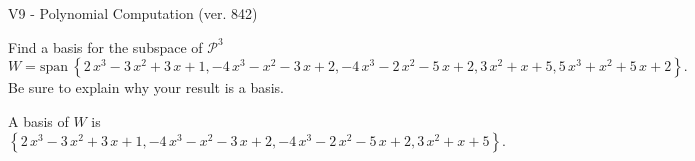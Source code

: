 \begin{exercise}
  \begin{exerciseTitle}V9 - Polynomial Computation (ver. 842)\end{exerciseTitle}
  \begin{exerciseStatement}
    Find a basis for the subspace of \(\mathcal{P}^3\) 
\[W=\mathrm{span}\ \left\{2 \, x^{3} - 3 \, x^{2} + 3 \, x + 1 , -4 \, x^{3} - x^{2} - 3 \, x + 2 , -4 \, x^{3} - 2 \, x^{2} - 5 \, x + 2 , 3 \, x^{2} + x + 5 , 5 \, x^{3} + x^{2} + 5 \, x + 2\right\}.\]
 Be sure to explain why your result is a basis.


  \end{exerciseStatement}
  \begin{exerciseAnswer}
   A basis of \(W\) is  \(\left\{2 \, x^{3} - 3 \, x^{2} + 3 \, x + 1 , -4 \, x^{3} - x^{2} - 3 \, x + 2 , -4 \, x^{3} - 2 \, x^{2} - 5 \, x + 2 , 3 \, x^{2} + x + 5\right\}\).
  


  \end{exerciseAnswer}
\end{exercise}